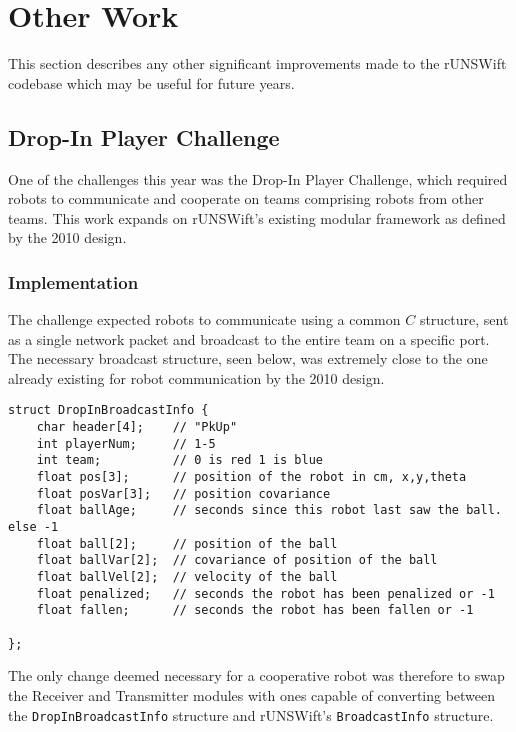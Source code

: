 \chapter{Other Work}
\label{chap:misc}

This section describes any other significant improvements made to the rUNSWift codebase which may be useful for future years.

\section{Drop-In Player Challenge}

One of the challenges this year was the Drop-In Player Challenge, which required robots to communicate and cooperate on teams comprising robots from other teams. This work expands on rUNSWift's existing modular framework as defined by the 2010 design\cite{runswift_2010}.

\subsection{Implementation}

The challenge expected robots to communicate using a common $C$ structure, sent as a single network packet and broadcast to the entire team on a specific port. The necessary broadcast structure, seen below, was extremely close to the one already existing for robot communication by the 2010 design. 

\begin{lstlisting}
struct DropInBroadcastInfo {
    char header[4];    // "PkUp"
    int playerNum;     // 1-5
    int team;          // 0 is red 1 is blue
    float pos[3];      // position of the robot in cm, x,y,theta
    float posVar[3];   // position covariance
    float ballAge;     // seconds since this robot last saw the ball. else -1
    float ball[2];     // position of the ball
    float ballVar[2];  // covariance of position of the ball
    float ballVel[2];  // velocity of the ball
    float penalized;   // seconds the robot has been penalized or -1
    float fallen;      // seconds the robot has been fallen or -1

};
\end{lstlisting}

The only change deemed necessary for a cooperative robot was therefore to swap the Receiver and Transmitter modules with ones capable of converting between the \texttt{DropInBroadcastInfo} structure and rUNSWift's \texttt{BroadcastInfo} structure.


